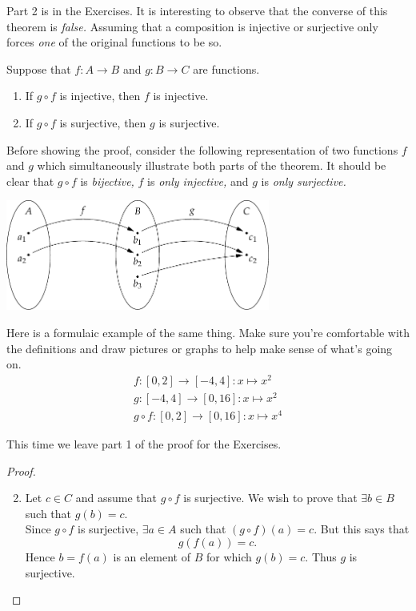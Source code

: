 \noindent Part 2 is in the Exercises. It is interesting to observe that the converse of this theorem is \emph{false.} Assuming that a composition is injective or surjective only forces \emph{one} of the original functions to be so.

\begin{thm}
Suppose that $f:A\to B$ and $g:B\to C$ are functions.
\begin{enumerate}
  \item If $g\circ f$ is injective, then $f$ is injective.
  \item If $g\circ f$ is surjective, then $g$ is surjective.
\end{enumerate}
\end{thm}

\noindent Before showing the proof, consider the following representation of two functions $f$ and $g$ which simultaneously illustrate both parts of the theorem. It should be clear that $g\circ f$ is \emph{bijective,} $f$ is \emph{only injective,} and $g$ is \emph{only surjective.}

\begin{center}
\includegraphics[width=0.65\textwidth]{sets-17-injcomp}
\end{center}

\noindent Here is a formulaic example of the same thing. Make sure you're comfortable with the definitions and draw pictures or graphs to help make sense of what's going on.
\begin{gather*}
f:[0,2]\to[-4,4]:x\mapsto x^2\tag*{(injective only)}\\[5pt]
g:[-4,4]\to [0,16]:x\mapsto x^2\tag*{(surjective only)}\\[5pt]
g\circ f:[0,2]\to[0,16]:x\mapsto x^4\tag*{(bijective!)}
\end{gather*}\pagebreak


\noindent This time we leave part 1 of the proof for the Exercises.
\begin{proof}
\begin{enumerate}\setcounter{enumi}{1}
  \item Let $c\in C$ and assume that $g\circ f$ is surjective. We wish to prove that $\exists b\in B$ such that $g(b)=c$.\\
  Since $g\circ f$ is surjective, $\exists a\in A$ such that $(g\circ f)(a)=c$. But this says that
  \[g(f(a))=c.\]
  Hence $b=f(a)$ is an element of $B$ for which $g(b)=c$. Thus $g$ is surjective.\qedhere
\end{enumerate}
\end{proof}


